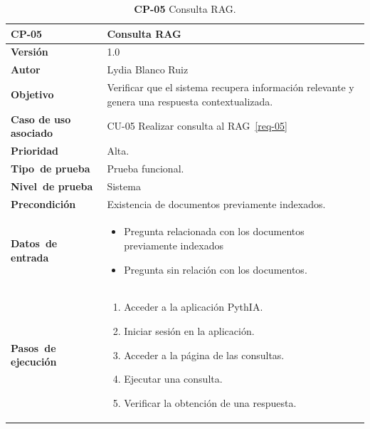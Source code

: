 \begin{table}[p]
	\centering
	\begin{tabularx}{\linewidth}{ p{} p{} }
		\toprule
		\textbf{CP-05}    & \textbf{Consulta RAG}\\
		\toprule
		\textbf{Versión}              & 1.0    \\
		\textbf{Autor}                & Lydia Blanco Ruiz \\
		\textbf{Objetivo}			 & Verificar que el sistema recupera información relevante y genera una respuesta contextualizada.\\
		\textbf{Caso de uso asociado} &  CU-05 Realizar consulta al RAG~\ref{req-05}\\
		\textbf{Prioridad}          & Alta. \\
		\textbf{\mbox{Tipo de} \mbox{prueba}}         & Prueba funcional. \\
		\textbf{\mbox{Nivel de} \mbox{prueba}}        & Sistema\\
		\textbf{Precondición}        & Existencia de documentos previamente indexados. \\
		\textbf{\mbox{Datos de} \mbox{entrada}} 		& 
		\begin{itemize}
		\tightlist
			\item Pregunta relacionada con los documentos previamente indexados
			\item Pregunta sin relación con los documentos.
		\end{itemize}				
		\\
		\textbf{\mbox{Pasos de} \mbox{ejecución}}		&
		\begin{enumerate}
		\tightlist
			\item Acceder a la aplicación \eng{web} PythIA.
			\item Iniciar sesión en la aplicación.
			\item Acceder a la página de las consultas.
			\item Ejecutar una consulta.
			\item Verificar la obtención de una respuesta.
		\end{enumerate} \\
		\bottomrule
	\end{tabularx}
	\caption{\textbf{CP-05} Consulta RAG.}
	\label{prueb-05}
\end{table}


